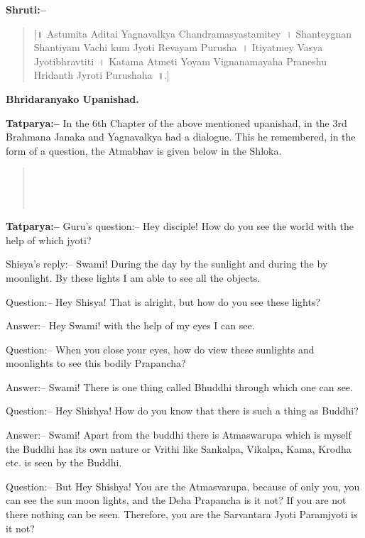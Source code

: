 \textbf{Shruti:–}

\begin{verse}
[॥ Astumita Aditai Yagnavalkya Chandramasyastamitey~। Shanteygnan Shantiyam Vachi kum Jyoti Revayam Purusha~। Itiyatmey Vasya Jyotibhravtiti~। Katama Atmeti Yoyam Vignanamayaha Praneshu Hridanth Jyroti Purushaha~॥.]
\end{verse}

\begin{flushright}
\textbf{Bhridaranyako Upanishad.}
\end{flushright}

\textbf{Tatparya:–} In the 6th Chapter of the above mentioned upanishad, in the 3rd Brahmana Janaka and Yagnavalkya had a dialogue. This he remembered, in the form of a question, the Atmabhav is given below in the Shloka.

\begin{verse}
 \\\\\\ 
\end{verse}

\textbf{Tatparya:–} Guru's question:– Hey disciple! How do you see the world with the help of which jyoti?

Shisya's reply:– Swami! During the day by the sunlight and during the by moonlight. By these lights I am able to see all the objects.

Question:– Hey Shisya! That is alright, but how do you see these lights?

Answer:– Hey Swami! with the help of my eyes I can see.

Question:– When you close your eyes, how do view these sunlights and moonlights to see this bodily Prapancha?

Answer:– Swami! There is one thing called Bhuddhi through which one can see.

Question:– Hey Shishya! How do you know that there is such a thing as Buddhi?

Answer:– Swami! Apart from the buddhi there is Atmaswarupa which is myself the Buddhi has its own nature or Vrithi like Sankalpa, Vikalpa, Kama, Krodha etc. is seen by the Buddhi.

Question:– But Hey Shishya! You are the Atmasvarupa, because of only you, you can see the sun moon lights, and the Deha Prapancha is it not? If you are not there nothing can be seen. Therefore, you are the Sarvantara Jyoti Paramjyoti is it not?

